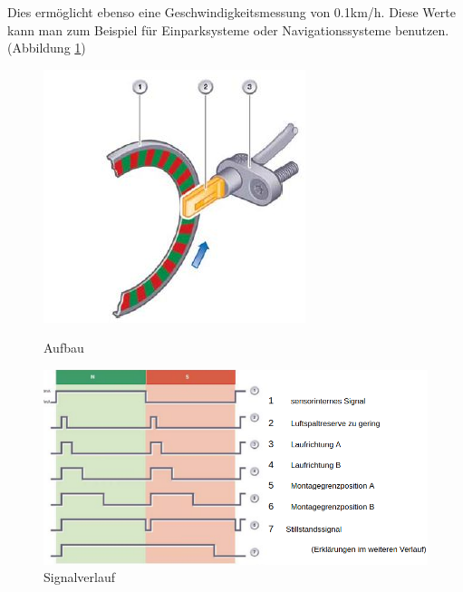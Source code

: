 \begin{flushleft}
		           Dies ermöglicht ebenso eine Geschwindigkeitsmessung von 0.1km/h. Diese Werte kann man zum Beispiel für Einparksysteme oder Navigationssysteme benutzen.\cite{TS_drehzahl_sensor}
		           (Abbildung \ref{fig:TS11})
		           
		           \begin{figure}[h]
			           \begin{minipage}[b]{.4\linewidth} %
			           		\includegraphics[width=\linewidth]{radsensor.png}
			           		\caption{Aufbau}
			           		\label{fig:TS10}
			           \end{minipage}
			           	\hspace{.1\linewidth}%
			           	\begin{minipage}[b]{.4\linewidth} %
			           		\includegraphics[width=\linewidth]{signalverlauf_hall.png}
			           		\caption[www.kfztech.de/kfztechnik/elo/sensoren/drehzahlsensor.htm]{Signalverlauf}
			           		\label{fig:TS11}
			           	\end{minipage}
		           	\end{figure}
	           

\end{flushleft}
